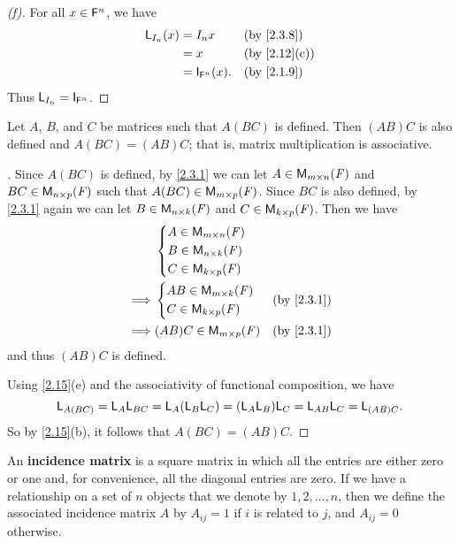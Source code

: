 \begin{proof}[(f)]
  For all \(x \in \mathsf{F}^n\), we have
  \begin{align*}
    \L_{I_n}(x) & = I_n x              &  & \by{2.3.8}   \\
                & = x                  &  & \by{2.12}[c] \\
                & = \IT_{\vs{F}^n}(x). &  & \by{2.1.9}
  \end{align*}
  Thus \(\L_{I_n} = \IT_{\vs{F}^n}\).
\end{proof}

\begin{thm}\label{2.16}
  Let \(A\), \(B\), and \(C\) be matrices such that \(A (BC)\) is defined.
  Then \((AB) C\) is also defined and \(A (BC) = (AB) C\);
  that is, matrix multiplication is associative.
\end{thm}

\begin{proof}[]
  Since \(A (BC)\) is defined, by \cref{2.3.1} we can let \(A \in \ms\) and \(BC \in \ms[n][p][\F]\) such that \(A (BC) \in \ms[m][p][\F]\).
  Since \(BC\) is also defined, by \cref{2.3.1} again we can let \(B \in \ms[n][k][\F]\) and \(C \in \ms[k][p][\F]\).
  Then we have
  \begin{align*}
             & \begin{dcases}
                 A \in \ms           \\
                 B \in \ms[n][k][\F] \\
                 C \in \ms[k][p][\F]
               \end{dcases}                      \\
    \implies & \begin{dcases}
                 AB \in \ms[m][k][\F] \\
                 C \in \ms[k][p][\F]
               \end{dcases}  &  & \by{2.3.1}            \\
    \implies & (AB) C \in \ms[m][p][\F] &  & \by{2.3.1}
  \end{align*}
  and thus \((AB) C\) is defined.

  Using \cref{2.15}(e) and the associativity of functional composition, we have
  \[
    \mathsf{L}_{A (BC)} = \mathsf{L}_A \mathsf{L}_{BC} = \mathsf{L}_A (\mathsf{L}_B \mathsf{L}_C) = (\mathsf{L}_A \mathsf{L}_B) \mathsf{L}_C = \mathsf{L}_{AB} \mathsf{L}_C = \mathsf{L}_{(AB) C}.
  \]
  So by \cref{2.15}(b), it follows that \(A (BC) = (AB) C\).
\end{proof}

\begin{defn}\label{2.3.9}
  An \textbf{incidence matrix} is a square matrix in which all the entries are either zero or one and, for convenience, all the diagonal entries are zero.
  If we have a relationship on a set of \(n\) objects that we denote by \(1, 2, \dots, n\), then we define the associated incidence matrix \(A\) by \(A_{i j} = 1\) if \(i\) is related to \(j\), and \(A_{i j} = 0\) otherwise.
\end{defn}


